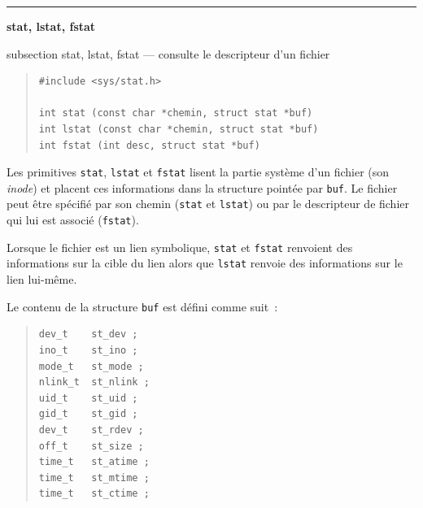 \documentclass [twoside] {report}
\newcommand {\primitive} [1]
    {
	\phantomsection
	{\large \textbf {#1}}
	\addcontentsline {toc} {subsection} {#1}
    }
\newcommand {\separation}
    {
	\vspace {5mm}
	\nopagebreak
	\hrule
    }
\begin{document}
\separation
\primitive {stat, lstat, fstat} --- consulte le descripteur d'un fichier
    \label {stat}

\begin {quote}
\begin {verbatim}
#include <sys/stat.h>

int stat (const char *chemin, struct stat *buf)
int lstat (const char *chemin, struct stat *buf)
int fstat (int desc, struct stat *buf)
\end{verbatim}
\end {quote}

Les primitives \texttt {stat}, \texttt {lstat} et \texttt {fstat} lisent la partie
système d'un fichier (son \textit {inode}) et placent ces informations dans
la structure pointée par \texttt {buf}. Le fichier peut être spécifié
par son chemin (\texttt {stat} et \texttt {lstat}) ou par le descripteur
de fichier qui lui est associé (\texttt {fstat}).

Lorsque le fichier est un lien symbolique, \texttt {stat} et \texttt {fstat}
renvoient des informations sur la cible du lien alors que \texttt {lstat}
renvoie des informations sur le lien lui-même.

Le contenu de la structure \texttt {buf} est défini
comme suit~:

\begin {quote}
\begin {verbatim}
dev_t    st_dev ;
ino_t    st_ino ;
mode_t   st_mode ;
nlink_t  st_nlink ;
uid_t    st_uid ;
gid_t    st_gid ;
dev_t    st_rdev ;
off_t    st_size ;
time_t   st_atime ;
time_t   st_mtime ;
time_t   st_ctime ;
\end{verbatim}
\end {quote}
\end{document}
